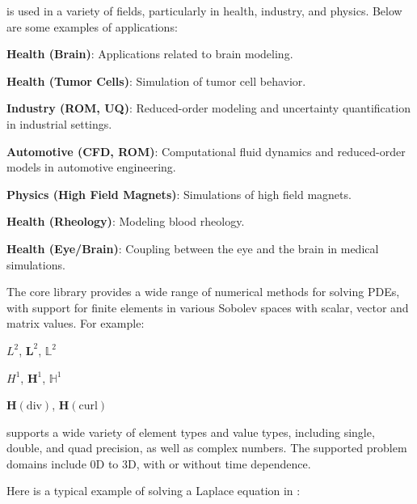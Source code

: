 \Feelpp is used in a variety of fields, particularly in health, industry, and physics. Below are some examples of applications:
\begin{inparaenum}[(i)]
    \item \textbf{Health (Brain)}: Applications related to brain modeling.
    \item \textbf{Health (Tumor Cells)}: Simulation of tumor cell behavior.
    \item \textbf{Industry (ROM, UQ)}: Reduced-order modeling and uncertainty quantification in industrial settings.
    \item \textbf{Automotive (CFD, ROM)}: Computational fluid dynamics and reduced-order models in automotive engineering.
    \item \textbf{Physics (High Field Magnets)}: Simulations of high field magnets.
    \item \textbf{Health (Rheology)}: Modeling blood rheology.
    \item \textbf{Health (Eye/Brain)}: Coupling between the eye and the brain in medical simulations.
\end{inparaenum}

The \Feelpp core library provides a wide range of numerical methods for solving PDEs, with support for finite elements in various Sobolev spaces with scalar, vector and matrix values. For example:
\begin{inparaenum}[(i)]
    \item \( L^2 \), \( \mathbf{L}^2 \), \( \mathbb{L}^2 \)
    \item \( H^1 \), \( \mathbf{H}^1 \), \( \mathbb{H}^1 \)
    \item \( \mathbf{H}(\text{div}) \), \( \mathbf{H}(\text{curl}) \)
\end{inparaenum}

\Feelpp supports a wide variety of element types and value types, including single, double, and quad precision, as well as complex numbers. The supported problem domains include 0D to 3D, with or without time dependence.

Here is a typical example of solving a Laplace equation in \Feelpp:

